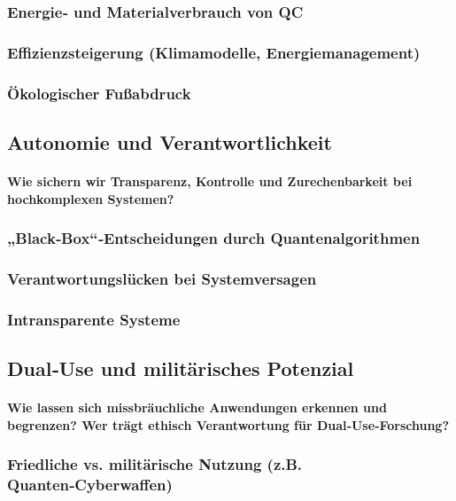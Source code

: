 \subsubsection{Energie‑ und Materialverbrauch von QC}
\subsubsection{Effizienzsteigerung (Klimamodelle, Energiemanagement)}
\subsubsection{Ökologischer Fußabdruck}

\subsection{Autonomie und Verantwortlichkeit}
\paragraph{Wie sichern wir Transparenz, Kontrolle und Zurechenbarkeit bei hochkomplexen Systemen?}

\subsubsection{ „Black‑Box“‑Entscheidungen durch Quantenalgorithmen}
\subsubsection{Verantwortungslücken bei Systemversagen}
\subsubsection{Intransparente Systeme}

\subsection{Dual‑Use und militärisches Potenzial}
\paragraph{Wie lassen sich missbräuchliche Anwendungen erkennen und begrenzen? 
Wer trägt ethisch Verantwortung für Dual‑Use‑Forschung?}

\subsubsection{Friedliche vs. militärische Nutzung (z.B. Quanten‑Cyberwaffen)}
